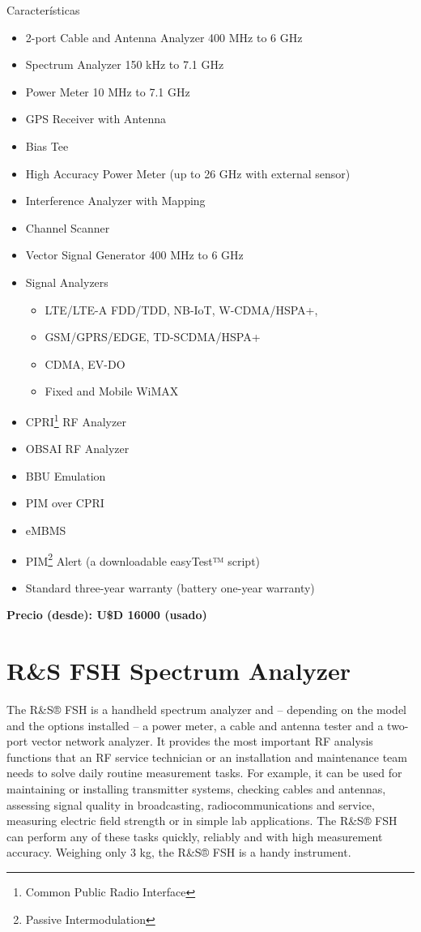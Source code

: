 \documentclass[a4paper,12pt]{report} %
\begin{document}
Características
\begin{itemize}
	\item 2-port Cable and Antenna Analyzer 400 MHz to 6 GHz
	\item Spectrum Analyzer 150 kHz to 7.1 GHz
	\item Power Meter 10 MHz to 7.1 GHz
	\item GPS Receiver with Antenna
	\item Bias Tee
	\item High Accuracy Power Meter (up to 26 GHz with external sensor)
	\item Interference Analyzer with Mapping
	\item Channel Scanner
	\item Vector Signal Generator 400 MHz to 6 GHz
	\item Signal Analyzers
	\begin{itemize}
		\item LTE/LTE-A FDD/TDD, NB-IoT, W-CDMA/HSPA+,
		\item GSM/GPRS/EDGE, TD-SCDMA/HSPA+
		\item CDMA, EV-DO
		\item Fixed and Mobile WiMAX
	\end{itemize}
	\item CPRI\footnote{Common Public Radio Interface} RF Analyzer
	\item OBSAI RF Analyzer
	\item BBU Emulation
	\item PIM over CPRI
	\item eMBMS
	\item PIM\footnote{Passive Intermodulation} Alert (a downloadable easyTest™ script)
	\item Standard three-year warranty (battery one-year warranty)
\end{itemize}

\large{\textbf{Precio (desde): U\$D 16000 (usado)}}

\section{R\&S FSH Spectrum Analyzer \cite{fsh}}

The R\&S® FSH is a handheld spectrum analyzer and – depending on the model and the options installed – a power meter, a cable and antenna tester and a two-port vector network analyzer. It provides the most important RF analysis functions that an RF service technician or an installation and maintenance team needs to solve daily routine measurement tasks. For example, it can be used for maintaining or installing transmitter systems, checking cables and antennas, assessing signal quality in broadcasting, radiocommunications and service, measuring electric field strength or in simple lab applications. The R\&S® FSH can perform any of these tasks quickly, reliably and with high measurement accuracy. Weighing only 3 kg, the R\&S® FSH is a handy instrument.
\end{document}
